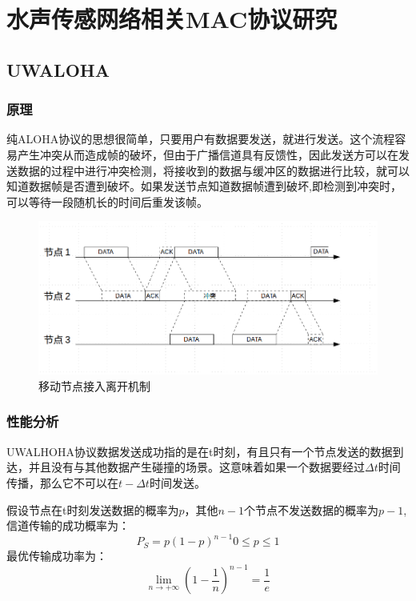 \chapter{水声传感网络相关MAC协议研究 }
\section{UWALOHA}
\subsection{原理}
纯ALOHA协议的思想很简单，只要用户有数据要发送，就进行发送。这个流程容易产生冲突从而造成帧的破坏，但由于广播信道具有反馈性，因此发送方可以在发送数据的过程中进行冲突检测，将接收到的数据与缓冲区的数据进行比较，就可以知道数据帧是否遭到破坏。如果发送节点知道数据帧遭到破坏,即检测到冲突时，可以等待一段随机长的时间后重发该帧。

\begin{figure}[ht]
	\centering
	\includegraphics[scale=0.4]{figures/aloha.png}
	\caption{
		移动节点接入离开机制
	}
	\label{fig:example}
\end{figure}

\subsection{性能分析}
\cite{Analysis of Aloha Protocols for Underwater Acoustic Sensor Networks}
UWALHOHA协议数据发送成功指的是在t时刻，有且只有一个节点发送的数据到达，并且没有与其他数据产生碰撞的场景。这意味着如果一个数据要经过$\Delta t$时间传播，那么它不可以在$t-\Delta t$时间发送。

假设节点在t时刻发送数据的概率为$p$，其他$n-1$个节点不发送数据的概率为$p-1$,信道传输的成功概率为：
\begin{equation}
P_S=p(1-p)^{n-1}   0\le p\le 1
\end{equation}
最优传输成功率为：
\begin{equation}
\lim\limits_{n\to+\infty} (1-\frac{1}{n})^{n-1}=\frac{1}{e}
\end{equation}
